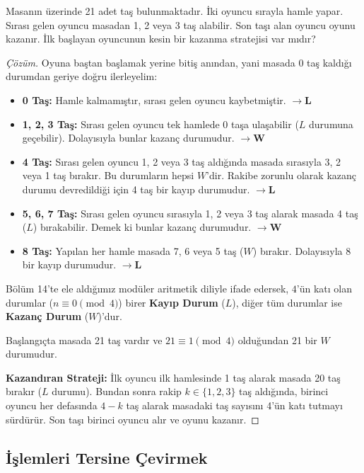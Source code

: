 \begin{example}
Masanın üzerinde 21 adet taş bulunmaktadır. İki oyuncu sırayla hamle yapar. Sırası gelen oyuncu masadan 1, 2 veya 3 taş alabilir. Son taşı alan oyuncu oyunu kazanır. İlk başlayan oyuncunun kesin bir kazanma stratejisi var mıdır?
\end{example}

\begin{proof}[Çözüm]
Oyuna baştan başlamak yerine bitiş anından, yani masada 0 taş kaldığı durumdan geriye doğru ilerleyelim:

\begin{itemize}
    \item \textbf{0 Taş:} Hamle kalmamıştır, sırası gelen oyuncu kaybetmiştir. $\to \mathbf{L}$
    \item \textbf{1, 2, 3 Taş:} Sırası gelen oyuncu tek hamlede 0 taşa ulaşabilir ($L$ durumuna geçebilir). Dolayısıyla bunlar kazanç durumudur. $\to \mathbf{W}$
    \item \textbf{4 Taş:} Sırası gelen oyuncu 1, 2 veya 3 taş aldığında masada sırasıyla 3, 2 veya 1 taş bırakır. Bu durumların hepsi $W$'dir. Rakibe zorunlu olarak kazanç durumu devredildiği için 4 taş bir kayıp durumudur. $\to \mathbf{L}$
    \item \textbf{5, 6, 7 Taş:} Sırası gelen oyuncu sırasıyla 1, 2 veya 3 taş alarak masada 4 taş ($L$) bırakabilir. Demek ki bunlar kazanç durumudur. $\to \mathbf{W}$
    \item \textbf{8 Taş:} Yapılan her hamle masada 7, 6 veya 5 taş ($W$) bırakır. Dolayısıyla 8 bir kayıp durumudur. $\to \mathbf{L}$
\end{itemize}

Bölüm 14'te ele aldığımız modüler aritmetik diliyle ifade edersek, $4$'ün katı olan durumlar ($n \equiv 0 \pmod 4$) birer \textbf{Kayıp Durum} ($L$), diğer tüm durumlar ise \textbf{Kazanç Durum} ($W$)'dur.

Başlangıçta masada 21 taş vardır ve $21 \equiv 1 \pmod 4$ olduğundan 21 bir $W$ durumudur.

\textbf{Kazandıran Strateji:} İlk oyuncu ilk hamlesinde 1 taş alarak masada 20 taş bırakır ($L$ durumu). Bundan sonra rakip $k \in \{1, 2, 3\}$ taş aldığında, birinci oyuncu her defasında $4 - k$ taş alarak masadaki taş sayısını 4'ün katı tutmayı sürdürür. Son taşı birinci oyuncu alır ve oyunu kazanır.
\end{proof}

\subsection{İşlemleri Tersine Çevirmek}

